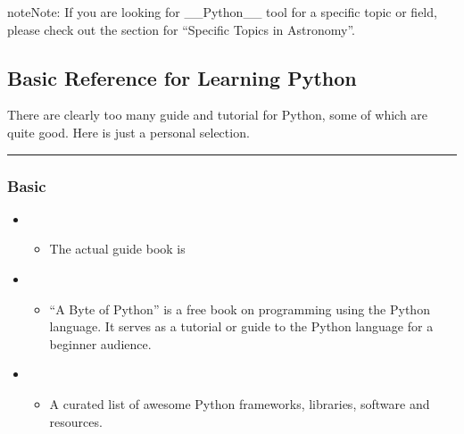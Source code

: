 \documentclass[letterpaper,10pt,english]{sphinxmanual}
\begin{document}
\begin{sphinxadmonition}{note}{Note:}
If you are looking for \_\_Python\_\_ tool for a specific topic or field, please check out the
section for “Specific Topics in Astronomy”.
\end{sphinxadmonition}


\subsection{Basic Reference for Learning Python}
\label{\detokenize{resource/programing/python_basic:basic-reference-for-learning-python}}\label{\detokenize{resource/programing/python_basic::doc}}
There are clearly too many guide and tutorial for Python, some of which
are quite good. Here is just a personal selection.


\bigskip\hrule\bigskip



\subsubsection{Basic}
\label{\detokenize{resource/programing/python_basic:basic}}\begin{itemize}
\item {} 
\begin{itemize}
\item {} 
The actual guide book is 

\end{itemize}

\item {} 
\begin{itemize}
\item {} 
“A Byte of Python” is a free book on programming using the Python
language. It serves as a tutorial or guide to the Python language
for a beginner audience.

\end{itemize}

\item {} 
\begin{itemize}
\item {} 
A curated list of awesome Python frameworks, libraries, software
and resources.

\end{itemize}

\end{itemize}
\end{document}
